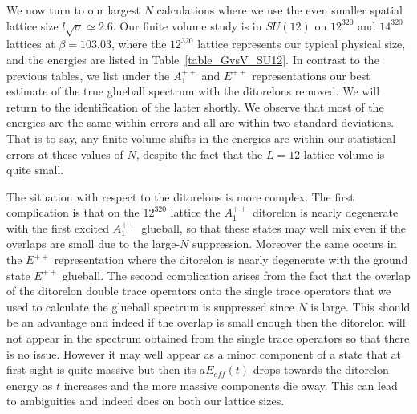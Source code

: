 \documentclass[12pt]{article}
\begin{document}
We now turn to our largest $N$ calculations where we use the even smaller spatial lattice size
$l\surd\sigma \simeq 2.6$. Our finite volume study is in $SU(12)$ on $12^320$ and $14^320$ lattices
at $\beta=103.03$, where the $12^320$ lattice represents our typical physical size, and the
energies are listed in Table~\ref{table_GvsV_SU12}. In contrast to the previous tables, we
list under the $A_1^{++}$ and $E^{++}$ representations our best estimate of the true glueball
spectrum with the ditorelons removed. We will return to the identification of the latter shortly.
We observe that most of the energies are the same within errors and all are within two standard
deviations. That is to say, any finite volume shifts in the energies are within our statistical
errors at these values of $N$, despite the fact that the $L=12$ lattice volume is quite small.

The situation with respect to the ditorelons is more complex. The first complication is that on
the  $12^320$ lattice the $A_1^{++}$ ditorelon is nearly degenerate with the first excited  $A_1^{++}$
glueball, so that these states may well mix even if the overlaps are small due to the large-$N$
suppression. Moreover the same occurs in the $E^{++}$ representation where the
ditorelon is nearly degenerate with the ground state $E^{++}$ glueball.
The second complication arises from the fact that the overlap of the ditorelon double trace
operators onto the single trace operators that we used to calculate the glueball spectrum
is suppressed since $N$ is large. This should
be an advantage and indeed if the overlap is small enough then the ditorelon will not appear
in the spectrum obtained from the single trace operators so that there is no issue.
However it may well appear as a minor component of
a state that at first sight is quite massive but then its $aE_{eff}(t)$ drops towards the
ditorelon energy as $t$ increases and the more massive components die away. This 
can lead to ambiguities and indeed does on both our lattice sizes.
\end{document}
